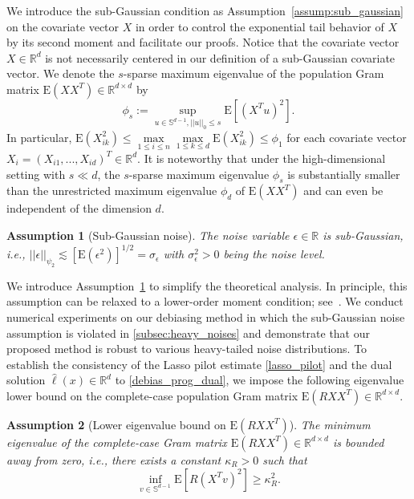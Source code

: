 \documentclass[ejsv2,noshowframe]{imsart}
\theoremstyle{plain}
\newtheorem{assumption}{Assumption}
\theoremstyle{definition}
\theoremstyle{remark}
\newcommand{\norm}[1]{\left|\left| #1 \right|\right|}
\renewcommand{\hat}{\widehat}
\begin{document}
We introduce the sub-Gaussian condition as Assumption~\ref{assump:sub_gaussian} on the covariate vector $X$ in order to control the exponential tail behavior of $X$ by its second moment and facilitate our proofs. 
Notice that the covariate vector $X \in \mathbb{R}^d$ is not necessarily centered in our definition of a sub-Gaussian covariate vector.
We denote the $s$-sparse maximum eigenvalue of the population Gram matrix $\mathrm{E}\left(XX^T\right) \in \mathbb{R}^{d\times d}$ by
\begin{equation}
	\label{max_eigen_gram}
	\phi_s := \sup_{u\in \mathbb{S}^{d-1}, \norm{u}_0\leq s} \mathrm{E}\left[(X^Tu)^2\right].
\end{equation}
In particular, $\mathrm{E}(X_{ik}^2) \leq \max\limits_{1\leq i \leq n}\max\limits_{1\leq k\leq d} \mathrm{E}(X_{ik}^2) \leq \phi_1$ for each covariate vector $X_i=(X_{i1},...,X_{id})^T \in \mathbb{R}^d$. It is noteworthy that under the high-dimensional setting with $s\ll d$, the $s$-sparse maximum eigenvalue $\phi_s$ is substantially smaller than the unrestricted maximum eigenvalue $\phi_d$ of $\mathrm{E}\left(XX^T\right)$ and can even be independent of the dimension $d$.

\begin{assumption}[Sub-Gaussian noise]
	\label{assump:subgau_error}
	The noise variable $\epsilon\in \mathbb{R}$ is sub-Gaussian, \emph{i.e.}, $\norm{\epsilon}_{\psi_2} \lesssim \left[\mathrm{E}(\epsilon^2) \right]^{1/2} = \sigma_{\epsilon}$ with $\sigma_{\epsilon}^2>0$ being the noise level. 
\end{assumption}

We introduce Assumption~\ref{assump:subgau_error} to simplify the theoretical analysis. In principle, this assumption can be relaxed to a lower-order moment condition; see~\cite{belloni2013least}. We conduct numerical experiments on our debiasing method in which the sub-Gaussian noise assumption is violated in \autoref{subsec:heavy_noises} and demonstrate that our proposed method is robust to various heavy-tailed noise distributions. To establish the consistency of the Lasso pilot estimate \eqref{lasso_pilot} and the dual solution $\hat{\ell}(x) \in \mathbb{R}^d$ to \eqref{debias_prog_dual}, we impose the following eigenvalue lower bound on the complete-case population Gram matrix $\mathrm{E}\left(RXX^T\right) \in \mathbb{R}^{d\times d}$.

\begin{assumption}[Lower eigenvalue bound on $\mathrm{E}\left(RXX^T\right)$]
	\label{assump:gram_lower_bnd}
	The minimum eigenvalue of the complete-case Gram matrix $\mathrm{E}\left(RXX^T\right) \in \mathbb{R}^{d\times d}$ is bounded away from zero, \emph{i.e.}, there exists a constant $\kappa_R>0$ such that 
	$$ \inf_{v\in \mathbb{S}^{d-1}} \mathrm{E}\left[R(X^Tv)^2\right] \geq \kappa_R^2.$$
\end{assumption}
\end{document}
